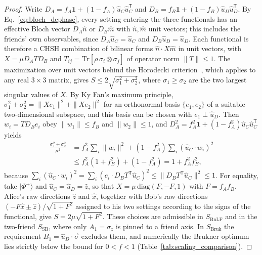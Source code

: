 \begin{proof}
Write $D_A = f_A \mathbf{1} + (1 - f_A)\hat{u}_C \hat{u}_C^{\mathsf{T}}$ and $D_B = f_B \mathbf{1} + (1 - f_B)\hat{u}_D \hat{u}_D^{\mathsf{T}}$. By Eq.~\eqref{eq:bloch_dephase}, every setting entering the three functionals has an effective Bloch vector $D_A \hat{n}$ or $D_B \hat{m}$ with $\hat{n}, \hat{m}$ unit vectors; this includes the friends' own observables, since $D_A \hat{u}_C = \hat{u}_C$ and $D_B \hat{u}_D = \hat{u}_D$. Each functional is therefore a CHSH combination of bilinear forms $\hat{n} \cdot X \hat{m}$ in unit vectors, with $X = \mu D_A T D_B$ and $T_{ij} = \mathrm{Tr}[\rho\,\sigma_i \otimes \sigma_j]$ of operator norm $\|T\| \le 1$. The maximization over unit vectors behind the Horodecki criterion~\cite{horodecki1995}, which applies to any real $3 \times 3$ matrix, gives $S \le 2\sqrt{\sigma_1^2 + \sigma_2^2}$, where $\sigma_1 \ge \sigma_2$ are the two largest singular values of $X$. By Ky Fan's maximum principle, $\sigma_1^2 + \sigma_2^2 = \|X e_1\|^2 + \|X e_2\|^2$ for an orthonormal basis $\{e_1, e_2\}$ of a suitable two-dimensional subspace, and this basis can be chosen with $e_1 \perp \hat{u}_D$. Then $w_i = T D_B e_i$ obey $\|w_1\| \le f_B$ and $\|w_2\| \le 1$, and $D_A^2 = f_A^2 \mathbf{1} + (1 - f_A^2)\hat{u}_C \hat{u}_C^{\mathsf{T}}$ yields
\begin{equation}
\begin{aligned}
    \frac{\sigma_1^2 + \sigma_2^2}{\mu^2} &= f_A^2 \sum_{i} \|w_i\|^2 + (1 - f_A^2) \sum_{i} (\hat{u}_C \cdot w_i)^2 \\
    &\le f_A^2 (1 + f_B^2) + (1 - f_A^2) = 1 + f_A^2 f_B^2,
\end{aligned}
\end{equation}
because $\sum_i (\hat{u}_C \cdot w_i)^2 = \sum_i (e_i \cdot D_B T^{\mathsf{T}} \hat{u}_C)^2 \le \|D_B T^{\mathsf{T}} \hat{u}_C\|^2 \le 1$. For equality, take $|\Phi^+\rangle$ and $\hat{u}_C = \hat{u}_D = \hat{z}$, so that $X = \mu\,\mathrm{diag}(F, -F, 1)$ with $F = f_A f_B$. Alice's raw directions $\hat{z}$ and $\hat{x}$, together with Bob's raw directions $(-F\hat{x} \pm \hat{z})/\sqrt{1 + F^2}$ assigned to his two settings according to the signs of the functional, give $S = 2\mu\sqrt{1 + F^2}$. These choices are admissible in $S_{\mathrm{BnLF}}$ and in the two-friend $S_{\mathrm{SB}}$, where only $A_1 = \sigma_z$ is pinned to a friend axis. In $S_{\mathrm{Bruk}}$ the requirement $B_1 = \hat{u}_D \cdot \vec{\sigma}$ excludes them, and numerically the Brukner optimum lies strictly below the bound for $0 < f < 1$ (Table~\ref{tab:scaling_comparison}).
\end{proof}


